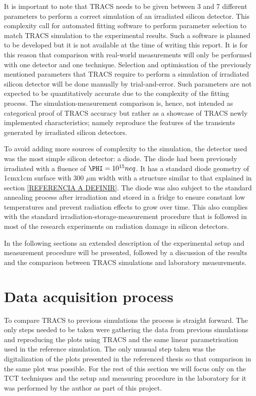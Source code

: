 It is important to note that TRACS needs to be given between 3 and 7 different parameters to perform a correct simulation of an irradiated silicon detector. This complexity call for automated fitting software to perform parameter selection to match TRACS simulation to the experimental results. Such a software is planned to be developed but it is not available at the time of writing this report. It is for this reason that comparison with real-world measurements will only be performed with one detector and one technique. Selection and optimisation of the previously mentioned parameters that TRACS require to perform a simulation of irradiated silicon detector will be done manually by trial-and-error. Such parameters are not expected to be quantitatively accurate due to the complexity of the fitting process. The simulation-measurement comparison is, hence, not intended as categorical proof of TRACS accuracy but rather as a showcase of TRACS newly implemented characteristics; namely reproduce the features of the transients generated by irradiated silicon detectors.

To avoid adding more sources of complexity to the simulation, the detector used was the most simple silicon detector: a diode. The diode had been previously irradiated with a fluence of $\PHI = 10^{15} neq$. It has a standard diode geometry of 1cmx1cm surface with 300 $\mu$m width with a structure similar to that explained in section \ref{REFERENCIA A DEFINIR}. The diode was also subject to the standard annealing process after irradiation and stored in a fridge to ensure constant low temperatures and prevent radiation effects to grow over time. This also complies with the standard irradiation-storage-measurement procedure that is followed in most of the research experiments on radiation damage in silicon detectors.

In the following sections an extended description of the experimental setup and  measurement procedure will be presented, followed by a discussion of the results and the comparison between TRACS simulations and laboratory measurements.

\section{Data acquisition process} %
\label{sec:future_improvements}

To compare TRACS to previous simulations the process is straight forward. The only steps needed to be taken were gathering the data from previous simulations and reproducing the plots using TRACS and the same linear \neff parametrisation used in the reference simulation. The only unusual step taken was the digitalization of the plots presented in the referenced thesis so that comparison in the same plot was possible. For the rest of this section we will focus only on the TCT techniques and the setup and measuring procedure in the laboratory for it was performed by the author as part of this project.

